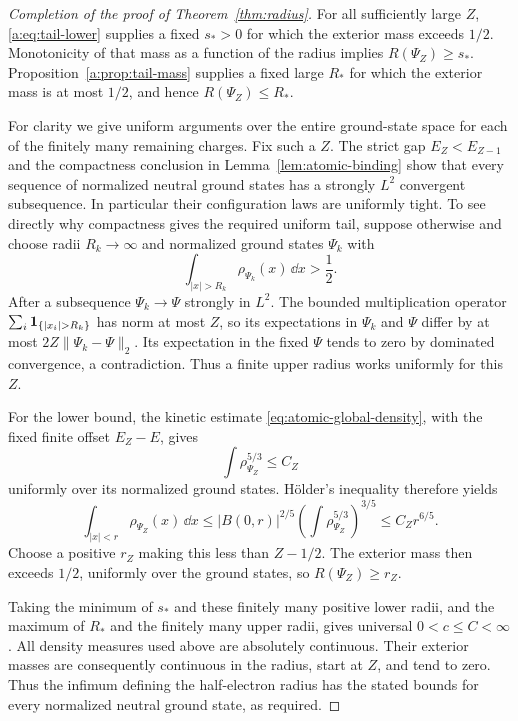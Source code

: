 \begin{proof}[Completion of the proof of Theorem~\ref{thm:radius}]
For all sufficiently large $Z$, \eqref{a:eq:tail-lower} supplies a fixed
$s_*>0$ for which the exterior mass exceeds $1/2$.  Monotonicity of
that mass as a function of the radius implies
$R(\Psi_Z)\ge s_*$.  Proposition~\ref{a:prop:tail-mass} supplies a fixed
large $R_*$ for which the exterior mass is at most $1/2$, and hence
$R(\Psi_Z)\le R_*$.

For clarity we give uniform arguments over the entire ground-state
space for each of the finitely many remaining charges.  Fix such a
$Z$.  The strict gap $E_Z<E_{Z-1}$ and the compactness conclusion in
Lemma~\ref{lem:atomic-binding} show that every sequence of normalized
neutral ground states has a strongly $L^2$ convergent subsequence.
In particular their configuration laws are uniformly tight.  To see
directly why compactness gives the required uniform tail, suppose
otherwise and choose radii $R_k\to\infty$ and normalized ground
states $\Psi_k$ with
\[
 \int_{|x|>R_k}\rho_{\Psi_k}(x)\,\dd x>\frac12.
\]
After a subsequence $\Psi_k\to\Psi$ strongly in $L^2$.  The bounded
multiplication operator $\sum_i\1_{\{|x_i|>R_k\}}$ has norm at most
$Z$, so its expectations in $\Psi_k$ and $\Psi$ differ by at most
$2Z\|\Psi_k-\Psi\|_2$.  Its expectation in the fixed $\Psi$ tends to
zero by dominated convergence, a contradiction.  Thus a finite
upper radius works uniformly for this $Z$.

For the lower bound, the kinetic estimate
\eqref{eq:atomic-global-density}, with the fixed finite offset $E_Z-E$, gives
\[
 \int\rho_{\Psi_Z}^{5/3}\le C_Z
\]
uniformly over its normalized ground states.  H\"older's inequality
therefore yields
\[
 \int_{|x|<r}\rho_{\Psi_Z}(x)\,\dd x
 \le |B(0,r)|^{2/5}
       \left(\int\rho_{\Psi_Z}^{5/3}\right)^{3/5}
 \le C_Z r^{6/5}.
\]
Choose a positive $r_Z$ making this less than $Z-1/2$.  The exterior
mass then exceeds $1/2$, uniformly over the ground states, so
$R(\Psi_Z)\ge r_Z$.

Taking the minimum of $s_*$ and these finitely many positive lower
radii, and the maximum of $R_*$ and the finitely many upper radii,
gives universal $0<c\le C<\infty$.  All density measures used above
are absolutely continuous.  Their exterior masses are consequently
continuous in the radius, start at $Z$, and tend to zero.  Thus the
infimum defining the half-electron radius has the stated bounds for
every normalized neutral ground state, as required.
\end{proof}
